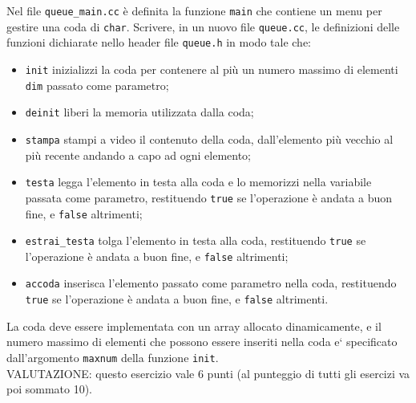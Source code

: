 Nel file {\tt queue\_main.cc} \`e definita la funzione {\tt main} che
contiene un menu per gestire una coda di {\tt char}. 
Scrivere, in un nuovo file {\tt queue.cc}, 
le definizioni delle funzioni dichiarate nello header file \texttt{queue.h} 
in modo tale che:
\begin{itemize}
\item
\texttt{init} inizializzi la coda per contenere al pi\`u un numero massimo di elementi
{\tt dim} passato come parametro;
\item 
\texttt{deinit} liberi la memoria utilizzata dalla coda;
\item
\texttt{stampa} stampi a video il contenuto della coda, dall'elemento
pi\`u vecchio al pi\`u recente andando a capo ad ogni elemento;
\item
\texttt{testa} legga l'elemento in testa alla coda e lo memorizzi nella
variabile passata come parametro,
restituendo {\tt true} se l'operazione \`e andata a buon fine,
e {\tt false} altrimenti;
\item
\texttt{estrai\_testa} tolga l'elemento in testa alla coda,
restituendo {\tt true} se l'operazione \`e andata a buon fine, 
e {\tt false} altrimenti;
\item
\texttt{accoda} inserisca l'elemento passato come parametro nella coda,
restituendo {\tt true} se l'operazione \`e andata a buon fine, 
e {\tt false} altrimenti.
\end{itemize}

La coda deve essere implementata con un array allocato dinamicamente, e il numero
massimo di elementi che possono essere inseriti nella coda e` specificato
dall'argomento {\tt maxnum} della funzione {\tt init}.\\


VALUTAZIONE:
questo esercizio vale 6 punti 
(al punteggio di tutti gli esercizi va poi sommato 10).
